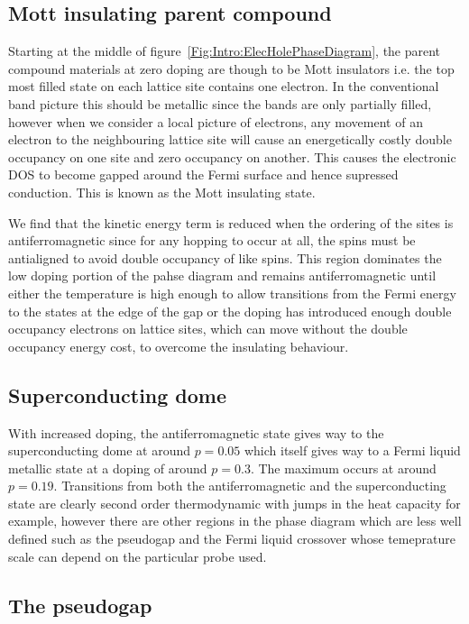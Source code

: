 \subsection{Mott insulating parent compound}

Starting at the middle of figure~\ref{Fig:Intro:ElecHolePhaseDiagram}, the parent compound materials at zero doping are though to be Mott insulators i.e. the top most filled state on each lattice site contains one electron. In the conventional band picture this should be metallic since the bands are only partially filled, however when we consider a local picture of electrons, any movement of an electron to the neighbouring lattice site will cause an energetically costly double occupancy on one site and zero occupancy on another. This causes the electronic \ac{DOS} to become gapped around the Fermi surface and hence supressed conduction. This is known as the Mott insulating state.

We find that the kinetic energy term is reduced when the ordering of the sites is antiferromagnetic since for any hopping to occur at all, the spins must be antialigned to avoid double occupancy of like spins. This region dominates the low doping portion of the pahse diagram and remains antiferromagnetic until either the temperature is high enough to allow transitions from the Fermi energy to the states at the edge of the gap or the doping has introduced enough double occupancy electrons on lattice sites, which can move without the double occupancy energy cost, to overcome the insulating behaviour.

\subsection{Superconducting dome}

With increased doping, the antiferromagnetic state gives way to the superconducting dome at around $p=0.05$ which itself gives way to a Fermi liquid metallic state at a doping of around $p=0.3$. The maximum \Tc occurs at around $p=0.19$. Transitions from both the antiferromagnetic and the superconducting state are clearly second order thermodynamic with jumps in the heat capacity for example, however there are other regions in the phase diagram which are less well defined such as the pseudogap and the Fermi liquid crossover whose temeprature scale can depend on the particular probe used.

\subsection{The pseudogap}

